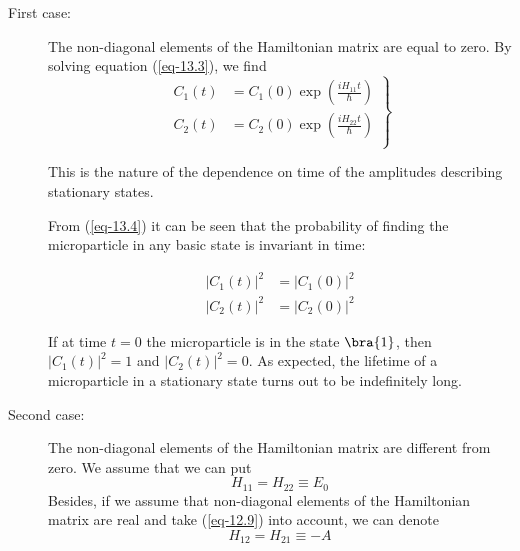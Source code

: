 \documentclass[a4paper,sfsidenotes,colorlinks=true]{tufte-book}
\numberwithin{equation}{section}
\numberwithin{figure}{section}
\begin{document}
\begin{description}%
\item[First case:] The non-diagonal elements of the Hamiltonian matrix
  are equal to zero. By solving equation (\ref{eq-13.3}), we find 
\begin{equation}%
\left.
\begin{split}
C_{1}(t) & = C_{1}(0) \exp \left( \frac{i H_{11}t}{\hbar} \right) \\
C_{2}(t) & = C_{2}(0) \exp \left( \frac{i H_{22}t}{\hbar} \right) \\
\end{split}
\right\}
\label{eq-13.4}
\end{equation}

This is the nature of the dependence on time of the amplitudes
describing stationary states. 

From (\ref{eq-13.4}) it can be seen that the probability of finding
the microparticle in any basic state is invariant in time: 

\begin{equation}%
\begin{split}
|C_{1} (t)|^{2} & = |C_{1} (0)|^{2} \\
|C_{2} (t)|^{2} & = |C_{2} (0)|^{2} 
\end{split}
\label{eq-13.5}
\end{equation}

If at time $t = 0$ the microparticle is in the state $\bra{1}$, then
$|C_{1} (t)|^{2} = 1$ and $|C_{2} (t)|^{2} = 0$. As expected, the
lifetime of a microparticle in a stationary state turns out to be
indefinitely long.

\item[Second case:] The non-diagonal elements of the
  Hamiltonian matrix are different from zero. We assume that we can
  put
\begin{equation}%
H_{11}=H_{22} \equiv E_{0}
\label{eq-13.6}
\end{equation}
Besides, if we assume that non-diagonal elements of the Hamiltonian
matrix are real and take (\ref{eq-12.9}) into account, we can denote
\begin{equation}%
H_{12}=H_{21} \equiv - A
\label{eq-13.7}
\end{equation}


\end{description}
\end{document}
